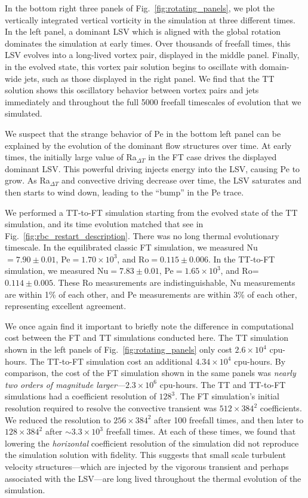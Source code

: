 \documentclass[aps, pre, onecolumn, nofootinbib, notitlepage, groupedaddress, amsfonts, amssymb, amsmath, longbibliography, superscriptaddress]{revtex4-1}
\newcommand{\ea}[1]{{\color{red} #1}}
\begin{document}
In the bottom right three panels of Fig.~\ref{fig:rotating_panels}, we plot the vertically integrated vertical vorticity in the simulation at three different times.
In the left panel, a dominant LSV which is aligned with the global rotation dominates the simulation at early times.
Over thousands of freefall times, this LSV evolves into a long-lived vortex pair, displayed in the middle panel.
Finally, in the evolved state, this vortex pair solution begins to oscillate with domain-wide jets, such as those displayed in the right panel.
We find that the TT solution shows this oscillatory behavior between vortex pairs and jets immediately and throughout the full 5000 freefall timescales of evolution that we simulated.

We suspect that the strange behavior of Pe in the bottom left panel can be explained by the evolution of the dominant flow structures over time.
At early times, the initially large value of Ra$_{\Delta T}$ in the FT case drives the displayed dominant LSV.
This powerful driving injects energy into the LSV, causing Pe to grow.
As Ra$_{\Delta T}$ and convective driving decrease over time, the LSV saturates and then starts to wind down, leading to the ``bump'' in the Pe trace.

\ea{
We performed a TT-to-FT simulation starting from the evolved state of the TT simulation, and its time evolution matched that see in Fig.~\ref{fig:rbc_restart_description}.
There was no long thermal evolutionary timescale.
In the equilibrated classic FT simulation, we measured Nu$=7.90 \pm 0.01$, Pe$=1.70 \times 10^3$, and Ro$=0.115 \pm 0.006$.
In the TT-to-FT simulation, we measured Nu$=7.83 \pm 0.01$, Pe$=1.65 \times 10^3$, and Ro=$0.114 \pm 0.005$.
These Ro measurements are indistinguishable, Nu measurements are within 1\% of each other, and Pe measurements are within 3\% of each other, representing excellent agreement.
}

We once again find it important to briefly note the difference in computational cost between the FT and TT simulations conducted here.
The TT simulation shown in the left panels of Fig.~\ref{fig:rotating_panels} only cost $2.6 \times 10^4$ cpu-hours.
\ea{The TT-to-FT simulation cost an additional $4.34 \times 10^4$ cpu-hours.}
By comparison, the cost of the FT simulation shown in the same panels was \emph{nearly two orders of magnitude larger}---$2.3 \times 10^6$ cpu-hours.
The TT \ea{and TT-to-FT} simulations \ea{had a} coefficient resolution \ea{of} $128^3$.
The FT simulation's initial resolution required to resolve the convective transient was $512\times384^2$ coefficients.
We reduced the resolution to $256\times384^2$ after 100 freefall times, and then later to $128\times384^2$ after $\sim3.3 \times 10^3$ freefall times.
At each of these times, we found that lowering the \emph{horizontal} coefficient resolution of the simulation did not reproduce the simulation solution with fidelity.
This suggests that small scale turbulent velocity structures---which are injected by the vigorous transient and perhaps associated with the LSV---are long lived throughout the thermal evolution of the simulation.
\end{document}

